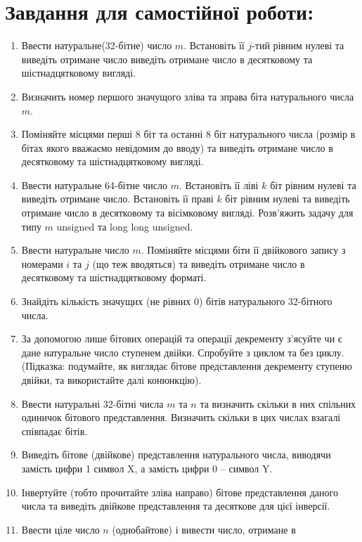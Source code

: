\documentclass[a5paper,titlepage,openany,twoside,draft]{book_unv}%
\begin{document}
\section{Завдання для самостійної роботи:}

\begin{enumerate}
\def\labelenumi{\arabic{enumi})}
\setcounter{enumi}{8}
\item
  Ввести натуральне(32-бітне) число $m$. Встановіть її $j$-тий рівним нулеві
  та виведіть отримане число виведіть отримане число в десятковому та
  шістнадцятковому вигляді.
\item
  Визначить номер першого значущого зліва та зправа біта натурального
  числа $m$.
\item
  Поміняйте місцями перші 8 біт та останні 8 біт натурального числа
  (розмір в бітах якого вважаємо невідомим до вводу) та виведіть
  отримане число в десятковому та шістнадцятковому вигляді.
\item
  Ввести натуральне 64-бітне число $m$. Встановіть її ліві $k$ біт рівним
  нулеві та виведіть отримане число. Встановіть її праві $k$ біт рівним
  нулеві та виведіть отримане число в десятковому та вісімковому
  вигляді. Розв'яжить задачу для типу $m$ unsigned та long long unsigned.
\item
  Ввести натуральне число $m$. Поміняйте місцями біти її двійкового запису
  з номерами $i$ та $j$ (що теж вводяться) та виведіть отримане число в
  десятковому та шістнадцятковому форматі.
\item
  Знайдіть кількість значущих (не рівних 0) бітів натурального
  32-бітного числа.
\item
  За допомогою лише бітових операцій та операції декременту з'ясуйте чи є
  дане натуральне число ступенем двійки. Спробуйте з циклом та без
  циклу. (Підказка: подумайте, як виглядає бітове представлення
  декременту ступеню двійки, та використайте далі конюнкцію).
\item
  Ввести натуральні 32-бітні числа $m$ та $n$ та визначить скільки в них
  спільних одиничок бітового представлення. Визначить скільки в цих
  числах взагалі співпадає бітів.
\item
  Виведіть бітове (двійкове) представлення натурального числа, 
виводячи замість цифри 1 символ X, а замість цифри 0 -- символ Y.
\item
  Інвертуйте (тобто прочитайте зліва направо) бітове представлення
  даного числа та виведіть двійкове представлення та десяткове для цієї
  інверсії.
\item
  Ввести ціле число $n$ (однобайтове) і вивести число, отримане в

\end{enumerate}
\end{document}
